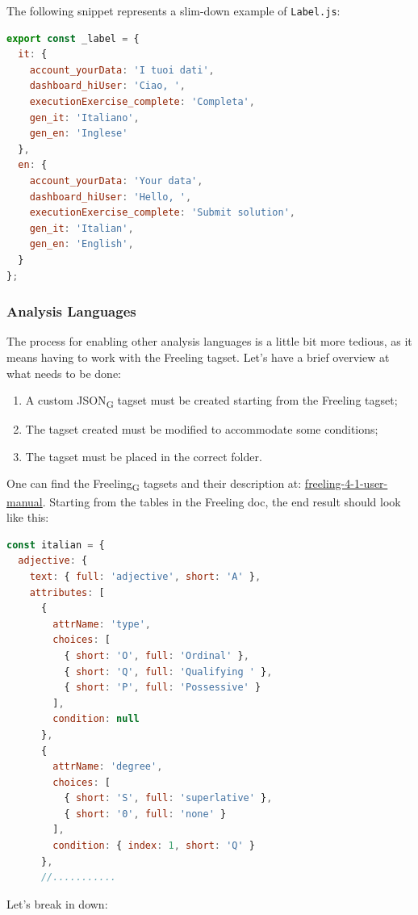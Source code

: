 The following snippet represents a slim-down example of \texttt{Label.js}:
\begin{lstlisting}[language=JavaScript, frame=single]
export const _label = {
  it: {
    account_yourData: 'I tuoi dati',
    dashboard_hiUser: 'Ciao, ',
    executionExercise_complete: 'Completa',
    gen_it: 'Italiano',
    gen_en: 'Inglese'
  },
  en: {
    account_yourData: 'Your data',
    dashboard_hiUser: 'Hello, ',
    executionExercise_complete: 'Submit solution',
    gen_it: 'Italian',
    gen_en: 'English',
  }
};
\end{lstlisting}


\subsubsection{Analysis Languages}
The process for enabling other analysis languages is a little bit more tedious, as it means having to work with the Freeling tagset.
Let's have a brief overview at what needs to be done:
\begin{enumerate}
\item A custom {JSON}\textsubscript{G} tagset must be created starting from the Freeling tagset;
\item The tagset created must be modified to accommodate some conditions;
\item The tagset must be placed in the correct folder.
\end{enumerate}
One can find the {Freeling}\textsubscript{G} tagsets and their description at: \href{https://talp-upc.gitbook.io/freeling-4-1-user-manual/tagsets}{freeling-4-1-user-manual}. Starting from the tables in the Freeling doc, the end result should look like this:
\begin{lstlisting}[language=JavaScript, frame=single]
const italian = {
  adjective: {
    text: { full: 'adjective', short: 'A' },
    attributes: [
      {
        attrName: 'type',
        choices: [
          { short: 'O', full: 'Ordinal' },
          { short: 'Q', full: 'Qualifying ' },
          { short: 'P', full: 'Possessive' }
        ],
        condition: null
      },
      {
        attrName: 'degree',
        choices: [
          { short: 'S', full: 'superlative' },
          { short: '0', full: 'none' }
        ],
        condition: { index: 1, short: 'Q' }
      },
      //...........
\end{lstlisting}
Let's break in down:
